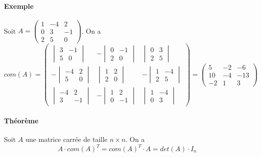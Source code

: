 \paragraph{Exemple} Soit $A = \begin{pmatrix} 1 & -4 & 2 \\ 0 & 3 & -1 \\ 2 & 5 & 0 \end{pmatrix}$. On a
$$com(A) = \begin{pmatrix}
  \begin{vmatrix} 3 & -1 \\ 5 & 0 \end{vmatrix} & -\begin{vmatrix} 0 & -1 \\ 2 & 0 \end{vmatrix} & \begin{vmatrix} 0 & 3 \\ 2 & 5 \end{vmatrix} \\
  -\begin{vmatrix} -4 & 2 \\ 5 & 0 \end{vmatrix} & \begin{vmatrix} 1 & 2 \\ 2 & 0 \end{vmatrix} & -\begin{vmatrix} 1 & -4 \\ 2 & 5 \end{vmatrix} \\
  \begin{vmatrix} -4 & 2 \\ 3 & -1 \end{vmatrix} & -\begin{vmatrix} 1 & 2 \\ 0 & -1 \end{vmatrix} & \begin{vmatrix} 1 & -4 \\ 0 & 3 \end{vmatrix}
\end{pmatrix} = \begin{pmatrix}
  5 & -2 & -6 \\
  10 & -4 & -13 \\
  -2 & 1 & 3
\end{pmatrix}$$

\paragraph{Théorème} Soit $A$ une matrice carrée de taille $n \times n$. On a
$$A \cdot com(A)^{T} = com(A)^{T} \cdot A = det(A) \cdot I_n$$

